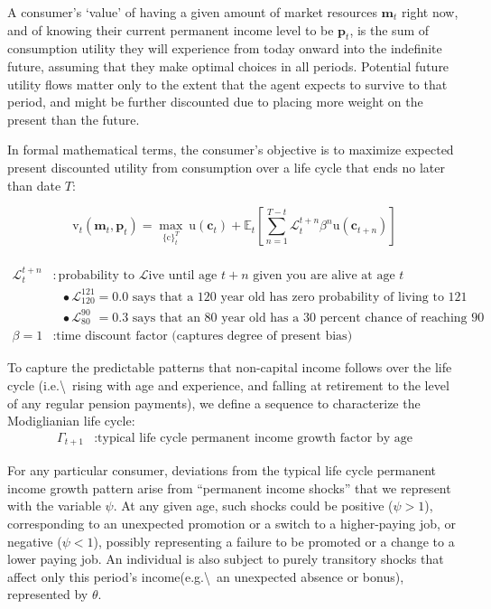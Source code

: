 \documentclass{article}
\newcommand{\uFunc}{\mathrm{u}}
\newcommand{\cLvl}{\mathbf{c}}
\newcommand{\mLvl}{\mathbf{m}}
\newcommand{\pLvl}{\mathbf{p}}
\newcommand{\DiscFac}{\beta}
\newcommand{\cFunc}{\mathrm{c}}
\newcommand{\vFunc}{\mathrm{v}}
\newcommand{\Alive}{\mathcal{L}}
\newcommand{\Ex}{\mathbb{E}}
\newcommand{\permGroFac}{\Gamma}
\newcommand{\permShk}{\psi}
\newcommand{\tranShk}{\theta}
\begin{document}
A consumer's `value' of having a given amount of market resources $\mLvl_{t}$ right now, and of knowing their current permanent income level to be $\pLvl_{t}$, is the sum of consumption utility they will experience from today onward into the indefinite future, assuming that they make optimal choices in all periods.
Potential future utility flows matter only to the extent that the agent expects to survive to that period, and might be further discounted due to placing more weight on the present than the future.

In formal mathematical terms, the consumer's objective is to maximize expected present discounted utility from consumption over a life cycle that ends no later than date $T$:

\begin{equation}
\label{eq:lifecyclemax}
\pmb{\vFunc}_{t}(\mLvl_{t},\pLvl_{t}) = \max_{\{\cFunc\}_{t}^{T}} ~ \uFunc(\cLvl_{t})+\Ex_{t}\left[\sum_{n=1}^{T-t} \Alive_{t}^{t+n}{\DiscFac}^{n} \uFunc(\cLvl_{t+n}) \right]
\end{equation}

\begin{align}
    \\ \Alive _{t}^{t+n} & : \text{probability to } \Alive \text{ive until age $t+n$ given you are alive at age $t$}
    \\                   & {~~~}\bullet \Alive_{120}^{121} = 0.0 \text{ says that a 120 year old has zero probability of living to 121}
    \\                   & {~~~}\bullet \Alive_{80\phantom{1}}^{90\phantom{1}} = 0.3 \text{ says that an 80 year old has a 30 percent chance of reaching 90}
    \\ \DiscFac = 1        & : \text{time discount factor (captures degree of present bias)}
\end{align}

To capture the predictable patterns that non-capital income follows over the life cycle (i.e.{\textbackslash}~rising with age and experience, and falling at retirement to the level of any regular pension payments), we define a sequence to characterize the Modiglianian life cycle:
\begin{align}
    \permGroFac_{t+1} & : \text{typical life cycle permanent income growth factor by age}
\end{align}

For any particular consumer, deviations from the typical life cycle permanent income growth pattern arise from ``permanent income shocks'' that we represent with the variable $\permShk$.
At any given age, such shocks could be positive ($\psi>1$), corresponding to an unexpected promotion or a switch to a higher-paying job, or negative ($\psi < 1$), possibly representing a failure to be promoted or a change to a lower paying job.
An individual is also subject to purely transitory shocks that affect only this period's income(e.g.{\textbackslash}~an unexpected absence or bonus), represented by $\tranShk$.
\end{document}
